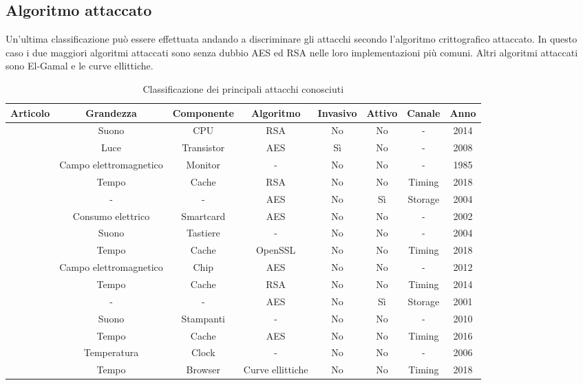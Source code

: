		\subsection*{Algoritmo attaccato}		
			Un'ultima classificazione può essere effettuata andando a discriminare gli attacchi secondo l'algoritmo crittografico attaccato. In questo caso i due maggiori algoritmi attaccati sono senza dubbio AES\cite{standard2001announcing} ed RSA\cite{rivest1978method} nelle loro implementazioni più comuni. Altri algoritmi attaccati sono El-Gamal\cite{elgamal1985public} e le curve ellittiche\cite{koblitz1987elliptic,miller1985use}.
			\begin{table}[]
				\scriptsize
				\centering
				\begin{tabular}{|c|c|c|c|c|c|c|c|} \hline
					Articolo					& Grandezza					& Componente	& Algoritmo			& Invasivo	& Attivo	& Canale	& Anno	\\ \hline \hline
					\cite{genkin2014rsa}		& Suono						& CPU			& RSA				& No		& No		& -			& 2014	\\ \hline
					\cite{ferrigno2008aes}		& Luce						& Transistor	& AES				& Sì		& No		& -			& 2008	\\ \hline
					\cite{van1985electromagn}	& Campo elettromagnetico	& Monitor    	& -					& No		& No		& -			& 1985	\\ \hline
					\cite{kocher2018spectre}	& Tempo						& Cache			& RSA				& No		& No		& Timing	& 2018	\\ \hline
					\cite{giraud2004dfa}		& -							& -				& AES				& No		& Sì		& Storage	& 2004	\\ \hline
					\cite{mangard2002simple}	& Consumo elettrico			& Smartcard		& AES				& No		& No		& -			& 2002	\\ \hline
					\cite{asonov2004keyboard}	& Suono						& Tastiere		& -					& No		& No		& -			& 2004	\\ \hline
					\cite{zhou2018efficient}	& Tempo						& Cache			& OpenSSL			& No		& No		& Timing	& 2018	\\ \hline
					\cite{martinasek2012simple}	& Campo elettromagnetico	& Chip			& AES				& No		& No		& -			& 2012	\\ \hline
					\cite{yarom2014flush+}		& Tempo						& Cache			& RSA				& No		& No		& Timing	& 2014	\\ \hline
					\cite{karri2001fault}		& -							& -				& AES				& No		& Sì		& Storage	& 2001	\\ \hline
					\cite{backes2010acoustic}	& Suono						& Stampanti		& -					& No		& No		& -			& 2010	\\ \hline
					\cite{lipp2016armageddon}	& Tempo						& Cache			& AES				& No		& No		& Timing	& 2016	\\ \hline
					\cite{murdoch2006hot}		& Temperatura				& Clock			& -					& No		& No		& -			& 2006	\\ \hline
					\cite{genkin2018drive}		& Tempo						& Browser		& Curve ellittiche	& No		& No		& Timing	& 2018	\\ \hline
				\end{tabular}
				\caption{Classificazione dei principali attacchi conosciuti}
				\label{tab:attacchi}
			\end{table}
